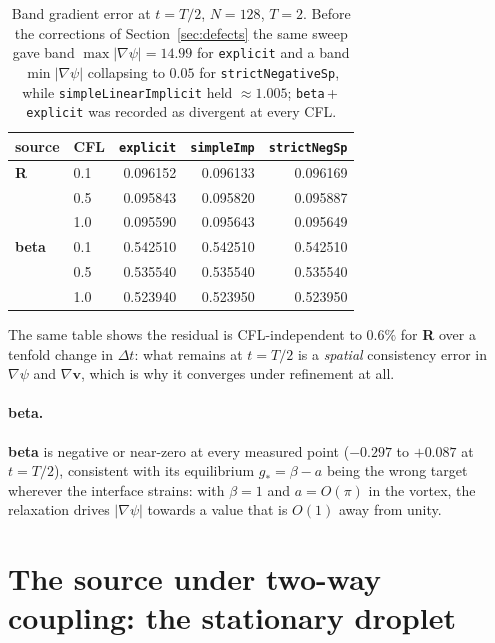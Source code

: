 \documentclass[preprint,3p,11pt]{elsarticle}
\newcommand{\psilev}{\psi}
\newcommand{\gradpsi}{\lvert\nabla\psilev\rvert}
\begin{document}
\begin{table}[htbp]
\centering
\caption{Band gradient error at $t=T/2$, $N=128$, $T=2$. Before the corrections
of Section~\ref{sec:defects} the same sweep gave band
$\max\gradpsi = 14.99$ for \texttt{explicit} and a band
$\min\gradpsi$ collapsing to $0.05$ for \texttt{strictNegativeSp}, while
\texttt{simpleLinearImplicit} held $\approx1.005$; \texttt{beta}\,+\,%
\texttt{explicit} was recorded as divergent at every CFL.}
\label{tab:agreement}
\small
\begin{tabular}{llrrr}
\toprule
source & CFL & \texttt{explicit} & \texttt{simpleImp} & \texttt{strictNegSp} \\
\midrule
\textbf{R}    & 0.1 & 0.096152 & 0.096133 & 0.096169 \\
              & 0.5 & 0.095843 & 0.095820 & 0.095887 \\
              & 1.0 & 0.095590 & 0.095643 & 0.095649 \\
\textbf{beta} & 0.1 & 0.542510 & 0.542510 & 0.542510 \\
              & 0.5 & 0.535540 & 0.535540 & 0.535540 \\
              & 1.0 & 0.523940 & 0.523950 & 0.523950 \\
\bottomrule
\end{tabular}
\end{table}

The same table shows the residual is CFL-independent to $0.6\%$ for \textbf{R}
over a tenfold change in $\Delta t$: what remains at $t=T/2$ is a \emph{spatial}
consistency error in $\nabla\psilev$ and $\nabla\mathbf{v}$, which is why it
converges under refinement at all.

\paragraph{beta.}
\textbf{beta} is negative or near-zero at every measured point
($-0.297$ to $+0.087$ at $t=T/2$), consistent with its equilibrium
$g_\ast = \beta - a$ being the wrong target wherever the interface strains:
with $\beta=1$ and $a = O(\pi)$ in the vortex, the relaxation drives $\gradpsi$
towards a value that is $O(1)$ away from unity.

\section{The source under two-way coupling: the stationary droplet}
\label{sec:coupled}
\end{document}
